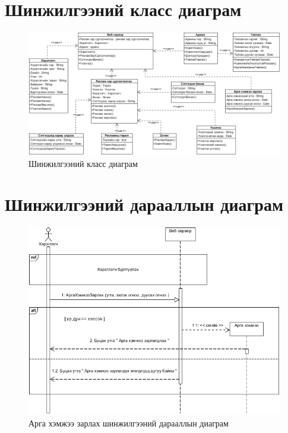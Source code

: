 \section{Шинжилгээний класс диаграм}

\begin{figure}[!h]
	\centering
	\includegraphics[angle=90,scale=0.7]{Diagrams/SClass}
	\caption[Шинжилгээний класс диаграм]{Шинжилгээний класс диаграм}
	\label{fig:SClass}
\end{figure}

\section{Шинжилгээний дарааллын диаграм}
\begin{figure}
	\centering
	\includegraphics[scale=0.7]{Diagrams/arga_hemjee}
	\caption[Арга хэмжээ зарлах шинжилгээний дарааллын диаграм]{Арга хэмжээ зарлах шинжилгээний дарааллын диаграм}
	\label{text}
\end{figure}

